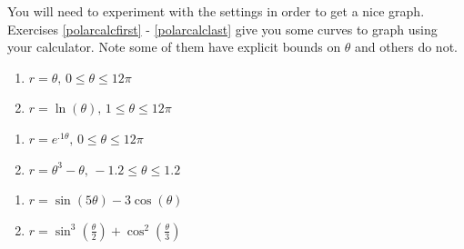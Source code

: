 \documentclass{ximera}
\begin{document}
You will need to experiment with the settings in order to get a nice graph.  Exercises \ref{polarcalcfirst} - \ref{polarcalclast} give you some curves to graph using your calculator.  Note some of them have explicit bounds on $\theta$ and others do not.

\begin{multicols}{2}

\begin{enumerate}

\setcounter{enumi}{\value{HW}}

\item $r = \theta, \, 0 \leq \theta \leq 12\pi$ \label{polarcalcfirst}
\item $r = \ln(\theta), \, 1 \leq \theta \leq 12\pi$

\setcounter{HW}{\value{enumi}}

\end{enumerate}

\end{multicols}

\begin{multicols}{2} 

\begin{enumerate}

\setcounter{enumi}{\value{HW}}

\item $r = e^{.1\theta}, \, 0 \leq \theta \leq 12\pi$
\item $r = \theta^{3} - \theta, \, -1.2 \leq \theta \leq 1.2$

\setcounter{HW}{\value{enumi}}

\end{enumerate}

\end{multicols}

\begin{multicols}{2} 

\begin{enumerate}

\setcounter{enumi}{\value{HW}}

\item $r = \sin(5\theta) - 3\cos(\theta)$
\item $r = \sin^{3}\left(\frac{\theta}{2}\right) + \cos^{2}\left(\frac{\theta}{3}\right)$

\setcounter{HW}{\value{enumi}}

\end{enumerate}

\end{multicols}
\end{document}
